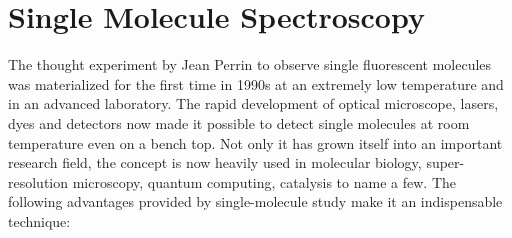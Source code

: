 \section{Single Molecule Spectroscopy}
The thought experiment by Jean Perrin to observe single fluorescent molecules was materialized for the first time in 1990s at an extremely low temperature and in an advanced laboratory.\cite{orrit1990single}
The rapid development of optical microscope, lasers, dyes and detectors now made it possible to detect single molecules at room temperature even on a bench top.\cite{xie1998optical,weiss1999fluorescence,moerner1999illuminating}
Not only it has grown itself into an important research field, the concept is now heavily used in molecular biology, super-resolution microscopy, quantum computing, catalysis to name a few.\cite{zhuang2000a,huang2008threedimensional,eisaman2011invited,lounis2005singlephoton,roeffaers2007singlemolecule}
The following advantages provided by single-molecule study make it an indispensable technique:
